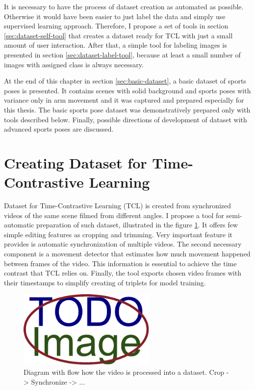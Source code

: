 It is necessary to have the process of dataset creation as automated as possible. Otherwise it would have been easier to just label the data and simply use supervised learning approach. Therefore, I propose a set of tools in section \ref{sec:dataset-self-tool} that creates a dataset ready for TCL with just a small amount of user interaction. After that, a simple tool for labeling images is presented in section \ref{sec:dataset-label-tool}, because at least a small number of images with assigned class is always necessary.

At the end of this chapter in section \ref{sec:basic-dataset}, a basic dataset of sports poses is presented. It contains scenes with solid background and sports poses with variance only in arm movement and it was captured and prepared especially for this thesis. The basic sports pose dataset was demonstratively prepared only with tools described below. Finally, possible directions of development of dataset with advanced sports poses are discussed.

\section{\label{sec:dataset-self-tool}Creating Dataset for Time-Contrastive Learning}

Dataset for Time-Contrastive Learning (TCL) is created from synchronized videos of the same scene filmed from different angles. I propose a tool for semi-automatic preparation of such dataset, illustrated in the figure \ref{fig:dataset-preparation}. It offers few simple editing features as cropping and trimming. Very important feature it provides is automatic synchronization of multiple videos. The second necessary component is a movement detector that estimates how much movement happened between frames of the video. This information is essential to achieve the time contrast that TCL relies on. Finally, the tool exports chosen video frames with their timestamps to simplify creating of triplets for model training.

\begin{figure}[ht]
    \centering
    \includegraphics[width=\linewidth,height=1.5in]{figures/placeholder.pdf}
    \caption{Diagram with flow how the video is processed into a dataset. Crop -> Synchronize -> ...}
    \label{fig:dataset-preparation}
\end{figure}

